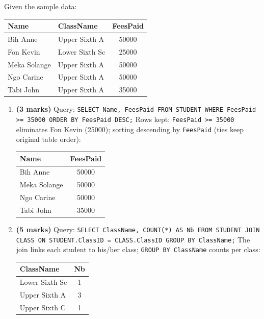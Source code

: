 \documentclass[11pt]{article}
\begin{document}
\begin{corrige}
Given the sample data:
\begin{center}
\begin{tabular}{|l|l|c|}
\hline
\rowcolor{popblueL} \textbf{Name} & \textbf{ClassName} & \textbf{FeesPaid} \\
\hline
Bih Anne & Upper Sixth A & 50000 \\
\hline
Fon Kevin & Lower Sixth Sc & 25000 \\
\hline
Meka Solange & Upper Sixth A & 50000 \\
\hline
Ngo Carine & Upper Sixth A & 50000 \\
\hline
Tabi John & Upper Sixth A & 35000 \\
\hline
\end{tabular}
\end{center}
\begin{enumerate}
\item \textbf{(3 marks)} Query: \texttt{SELECT Name, FeesPaid FROM STUDENT WHERE FeesPaid >= 35000 ORDER BY FeesPaid DESC;}
Rows kept: \texttt{FeesPaid >= 35000} eliminates Fon Kevin (25000); sorting descending by \texttt{FeesPaid} (ties keep original table order):
\begin{center}
\begin{tabular}{|l|c|}
\hline
\rowcolor{popblueL} \textbf{Name} & \textbf{FeesPaid} \\
\hline
Bih Anne & 50000 \\
\hline
Meka Solange & 50000 \\
\hline
Ngo Carine & 50000 \\
\hline
Tabi John & 35000 \\
\hline
\end{tabular}
\end{center}
\item \textbf{(5 marks)} Query: \texttt{SELECT ClassName, COUNT(*) AS Nb FROM STUDENT JOIN CLASS ON STUDENT.ClassID = CLASS.ClassID GROUP BY ClassName;}
The join links each student to his/her class; \texttt{GROUP BY ClassName} counts per class:
\begin{center}
\begin{tabular}{|l|c|}
\hline
\rowcolor{popblueL} \textbf{ClassName} & \textbf{Nb} \\
\hline
Lower Sixth Sc & 1 \\
\hline
Upper Sixth A & 3 \\
\hline
Upper Sixth C & 1 \\

\end{tabular}
\end{center}
\end{enumerate}
\end{corrige}
\end{document}

